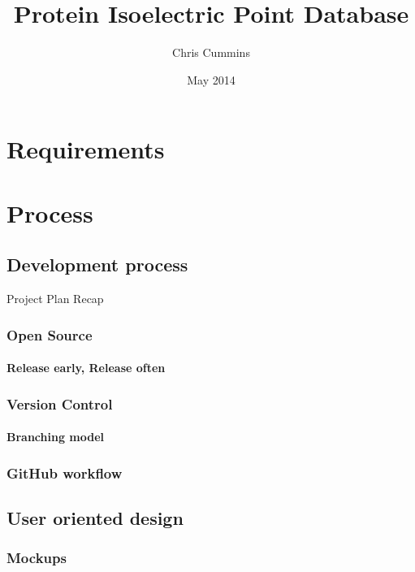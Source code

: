 \documentclass[12pt]{report}
\title{Protein Isoelectric Point Database}
\author{Chris Cummins}
\date{May 2014}
\begin{document}




\tableofcontents
\listoffigures
\listoftables

\newpage




\chapter{Requirements}

\chapter{Process}

\section{Development process}
Project Plan Recap

\subsection{Open Source}
\subsubsection{Release early, Release often}

\subsection{Version Control}
\subsubsection{Branching model}

\subsection{GitHub workflow}

\section{User oriented design}
\subsection{Mockups}
\end{document}

